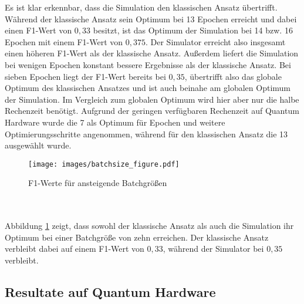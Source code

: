 Es ist klar erkennbar, dass die Simulation den klassischen Ansatz übertrifft.
Während der klassische Ansatz sein Optimum bei 13 Epochen erreicht und dabei einen F1-Wert
von $0,33$ besitzt, ist das Optimum der Simulation bei 14 bzw. 16 Epochen mit einem F1-Wert von
$0,375$. Der Simulator erreicht also insgesamt einen höheren F1-Wert als der klassische
Ansatz. Außerdem liefert die Simulation bei wenigen Epochen konstant bessere
Ergebnisse als der klassische Ansatz. Bei sieben
Epochen liegt der F1-Wert bereits bei $0,35$, übertrifft also das globale
Optimum des klassischen Ansatzes und ist auch beinahe am globalen Optimum der
Simulation. Im Vergleich zum globalen Optimum wird hier aber nur die halbe Rechenzeit benötigt.
Aufgrund der geringen verfügbaren Rechenzeit auf Quantum Hardware
wurde die 7 als Optimum für Epochen und weitere Optimierungsschritte angenommen,
während für den klassischen Ansatz die 13 ausgewählt wurde.
\begin{figure}[h!]
    \centering
    \texttt{[image: images/batchsize\_figure.pdf]}
    \caption{F1-Werte für ansteigende Batchgrößen}
    \label{fig:batchsize}
\end{figure}\\\\
Abbildung \ref{fig:batchsize} zeigt, dass sowohl der klassische Ansatz als auch die
Simulation ihr Optimum bei einer Batchgröße von zehn erreichen. 
Der klassische Ansatz verbleibt dabei auf einem F1-Wert von $0,33$, während der
Simulator bei $0,35$ verbleibt.

\subsection{Resultate auf Quantum Hardware}
\label{subsec:hardware}

